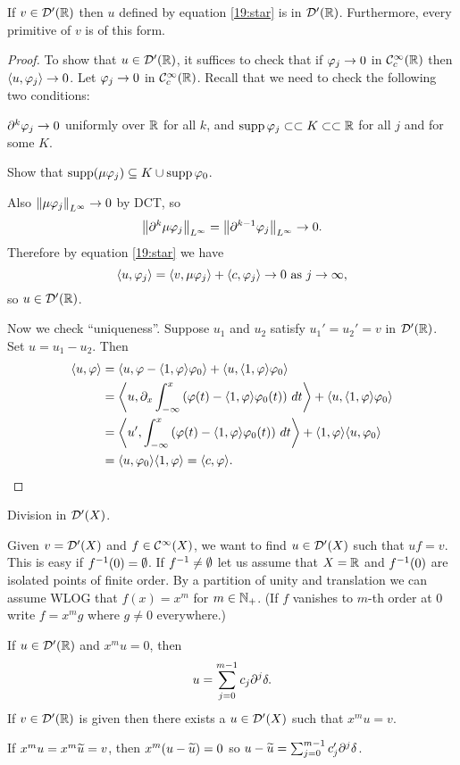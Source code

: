 \begin{thm}
  If $v\in\mathcal{D}'(\mathbb{R})$ then $u$ defined by equation \ref{19:star} is in $\mathcal{D}'(\mathbb{R})$.
  Furthermore, every primitive of $v$ is of this form.
\end{thm}

\begin{proof}
  To show that $u\in\mathcal{D}'(\mathbb{R})$, it suffices to check that if $\varphi_j\to0$ in $\mathcal{C}_c^\infty(\mathbb{R})$ then ${\left\langle u,\varphi_j \right\rangle}\to0$.
  Let $\varphi_j\to0$ in $\mathcal{C}_c^\infty(\mathbb{R})$.
  Recall that we need to check the following two conditions:
  \begin{itm}
    \io $\partial^k\varphi_j\to0$ uniformly over $\mathbb{R}$ for all $k$, and
    \io $\operatorname{supp}\varphi_j\subset\subset K\subset\subset \mathbb{R}$ for all $j$ and for some $K$.
  \end{itm}
  \begin{exer}
    Show that $\operatorname{supp}(\mu\varphi_j)\subseteq K\cup\operatorname{supp}\varphi_0$.
  \end{exer}
  Also $\left\lVert \mu\varphi_j \right\rVert_{L^\infty}\to0$ by DCT, so
  \[ \left\lVert \partial^k\mu\varphi_j \right\rVert_{L^\infty} = \left\lVert \partial^{k-1}\varphi_j \right\rVert_{L^\infty} \to 0. \]
  Therefore by equation \ref{19:star} we have
  \[ {\left\langle u,\varphi_j \right\rangle} = {\left\langle v,\mu\varphi_j \right\rangle} + {\left\langle c,\varphi_j \right\rangle} \to 0 \text{ as } j\to\infty, \]
  so $u\in\mathcal{D}'(\mathbb{R})$.

  Now we check ``uniqueness''.
  Suppose $u_1$ and $u_2$ satisfy $u_1'=u_2'=v$ in $\mathcal{D}'(\mathbb{R})$.
  Set $u=u_1-u_2$.
  Then
  \begin{align*}
    {\left\langle u,\varphi\right\rangle} &= {\left\langle u,\varphi-{\left\langle 1,\varphi \right\rangle}\varphi_0 \right\rangle} + {\left\langle u,{\left\langle 1,\varphi \right\rangle}\varphi_0 \right\rangle} \\
    &= {\left\langle u, \partial_x \int_{-\infty}^x \left( \varphi(t)-{\left\langle 1,\varphi \right\rangle}\varphi_0(t) \right) \, dt \right\rangle} + {\left\langle u,{\left\langle 1,\varphi \right\rangle}\varphi_0 \right\rangle} \\
    &= {\left\langle u', \int_{-\infty}^x \left( \varphi(t)-{\left\langle 1,\varphi \right\rangle}\varphi_0(t) \right) \, dt \right\rangle} + {\left\langle 1,\varphi \right\rangle}{\left\langle u,\varphi_0 \right\rangle} \\
    &= {\left\langle u,\varphi_0 \right\rangle}{\left\langle 1,\varphi \right\rangle} = {\left\langle c,\varphi \right\rangle}. \qedhere
  \end{align*}
\end{proof}

Division in $\mathcal{D}'(X)$.

Given $v=\mathcal{D}'(X)$ and $f\in\mathcal{C}^\infty(X)$, we want to find $u\in\mathcal{D}'(X)$ such that $uf=v$.
This is easy if $f^{-1}(0)=\emptyset$.
If $f^{-1}\neq\emptyset$ let us assume that $X=\mathbb{R}$ and $f^{-1}(0)$ are isolated points of finite order.
By a partition of unity and translation we can assume WLOG that $f(x)=x^m$ for $m\in\mathbb{N}_+$.
(If $f$ vanishes to $m$-th order at $0$ write $f=x^mg$ where $g\neq0$ everywhere.)

\begin{thm}
  \lv
  \begin{enum}
    \io If $u\in\mathcal{D}'(\mathbb{R})$ and $x^mu=0$, then
    \[ u = \sum_{j=0}^{m-1} c_j\partial^j\delta. \]
    \io If $v\in\mathcal{D}'(\mathbb{R})$ is given then there exists a $u\in\mathcal{D}'(X)$ such that $x^mu=v$.
  \end{enum}
\end{thm}

\begin{rmk}
  If $x^mu=x^m\widetilde u=v$, then $x^m(u-\widetilde u)=0$ so $u-\widetilde u=\sum_{j=0}^{m-1}c'_j\partial^j\delta$.
\end{rmk}
